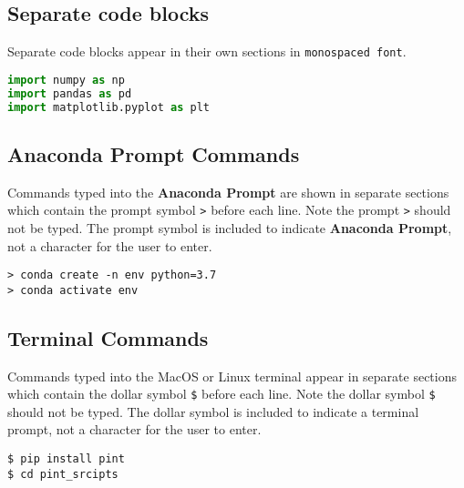 \documentclass{book}
\newcommand{\passthrough}[1]{#1}
\begin{document}
    
        \hypertarget{separate-code-blocks}{%
\subsection{Separate code blocks}\label{separate-code-blocks}}

Separate code blocks appear in their own sections in
\passthrough{\lstinline!monospaced font!}.

\begin{lstlisting}[language=Python]
import numpy as np
import pandas as pd
import matplotlib.pyplot as plt
\end{lstlisting}
    




    
        \hypertarget{anaconda-prompt-commands}{%
\subsection{Anaconda Prompt Commands}\label{anaconda-prompt-commands}}

Commands typed into the \textbf{Anaconda Prompt} are shown in separate
sections which contain the prompt symbol \passthrough{\lstinline!>!}
before each line. Note the prompt \passthrough{\lstinline!>!} should not
be typed. The prompt symbol is included to indicate \textbf{Anaconda
Prompt}, not a character for the user to enter.

\begin{lstlisting}
> conda create -n env python=3.7
> conda activate env
\end{lstlisting}
    




    
        \hypertarget{terminal-commands}{%
\subsection{Terminal Commands}\label{terminal-commands}}

Commands typed into the MacOS or Linux terminal appear in separate
sections which contain the dollar symbol \passthrough{\lstinline!$!}
before each line. Note the dollar symbol \passthrough{\lstinline!$!}
should not be typed. The dollar symbol is included to indicate a
terminal prompt, not a character for the user to enter.

\begin{lstlisting}
$ pip install pint
$ cd pint_srcipts
\end{lstlisting}
    
\end{document}
